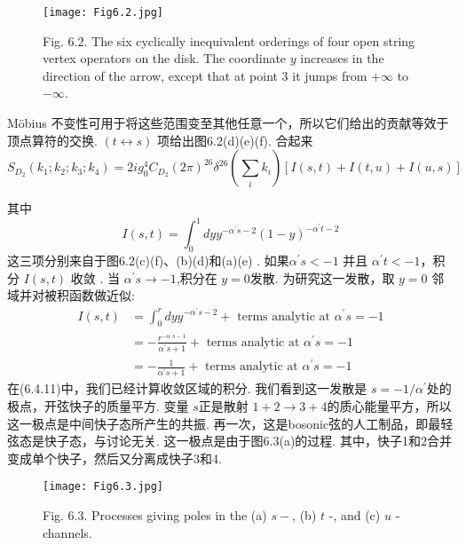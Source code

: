 \begin{figure}
	\begin{center}
		\texttt{[image: Fig6.2.jpg]}\\
		\caption{Fig. 6.2. The six cyclically inequivalent orderings of four open string vertex operators on the disk. The coordinate $y$ increases in the direction of the arrow, except that at point 3 it jumps from $+\infty$ to $-\infty$.}\label{Fig6.2}
	\end{center}
\end{figure}


Möbius 不变性可用于将这些范围变至其他任意一个，所以它们给出的贡献等效于顶点算符的交换.  $(t \leftrightarrow s)$ 项给出图6.2(d)(e)(f). 合起来
\begin{equation}
	S_{D_{2}}\left(k_{1} ; k_{2} ; k_{3} ; k_{4}\right)=2 i g_{0}^{4} C_{D_{2}}(2 \pi)^{26} \delta^{26}\left(\sum_{i} k_{i}\right)[I(s, t)+I(t, u)+I(u, s)]
\end{equation}

其中
\begin{equation}
	I(s, t)=\int_{0}^{1} d y y^{-\alpha^{\prime} s-2}(1-y)^{-\alpha^{\prime} t-2}
\end{equation}
这三项分别来自于图6.2(c)(f)、(b)(d)和(a)(e) .
如果$\alpha^{\prime} s<-1$ 并且 $\alpha^{\prime} t<-1$，积分 $I(s, t)$ 收敛 . 当 $\alpha^{\prime} s \rightarrow-1$,积分在 $y=0 $发散. 为研究这一发散，取 $y=0$ 邻域并对被积函数做近似:
\begin{equation}
	\begin{aligned}
		I(s, t) &=\int_{0}^{r} d y y^{-\alpha^{\prime} s-2}+\text { terms analytic at } \alpha^{\prime} s=-1 \\
		&=-\frac{r^{-\alpha^{\prime} s-1}}{\alpha^{\prime} s+1}+\text { terms analytic at } \alpha^{\prime} s=-1 \\
		&=-\frac{1}{\alpha^{\prime} s+1}+\text { terms analytic at } \alpha^{\prime} s=-1
	\end{aligned}
\end{equation}
在(6.4.11)中，我们已经计算收敛区域的积分. 我们看到这一发散是 $s=-1 / \alpha^{\prime}$处的极点，开弦快子的质量平方. 变量 $s$正是散射 $1+2 \rightarrow 3+4$的质心能量平方，所以这一极点是中间快子态所产生的共振. 再一次，这是bosonic弦的人工制品，即最轻弦态是快子态，与讨论无关. 这一极点是由于图6.3(a)的过程. 其中，快子1和2合并变成单个快子，然后又分离成快子3和4.

\begin{figure}
	\begin{center}
		\texttt{[image: Fig6.3.jpg]}\\
		\caption{Fig. 6.3. Processes giving poles in the (a) $s-$, (b) $t$ -, and (c) $u$ -channels.}\label{Fig6.3}
	\end{center}
\end{figure}

